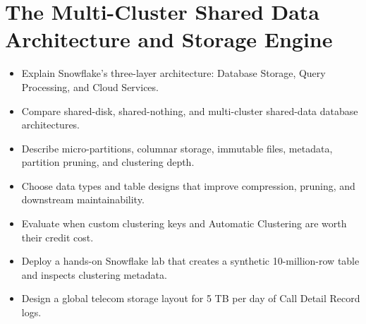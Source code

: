 \chapter{The Multi-Cluster Shared Data Architecture and Storage Engine}
%
\begin{objectives}
\begin{itemize}
    \item Explain Snowflake's three-layer architecture: Database Storage, Query Processing, and Cloud Services.
    \item Compare shared-disk, shared-nothing, and multi-cluster shared-data database architectures.
    \item Describe micro-partitions, columnar storage, immutable files, metadata, partition pruning, and clustering depth.
    \item Choose data types and table designs that improve compression, pruning, and downstream maintainability.
    \item Evaluate when custom clustering keys and Automatic Clustering are worth their credit cost.
    \item Deploy a hands-on Snowflake lab that creates a synthetic 10-million-row table and inspects clustering metadata.
    \item Design a global telecom storage layout for 5 TB per day of Call Detail Record logs.
\end{itemize}
\end{objectives}

